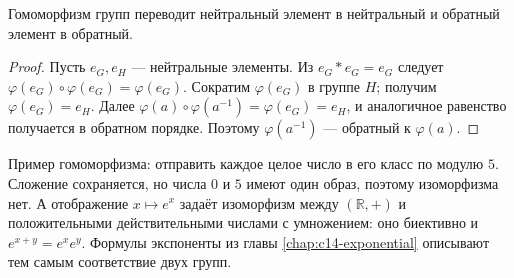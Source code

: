 \begin{theorem}\label{thm:legacy-c22-7}
Гомоморфизм групп переводит нейтральный элемент в нейтральный и обратный элемент в обратный.
\end{theorem}
\begin{proof}
Пусть \(e_G,e_H\) — нейтральные элементы. Из \(e_G*e_G=e_G\) следует \(\varphi(e_G)\circ\varphi(e_G)=\varphi(e_G)\). Сократим \(\varphi(e_G)\) в группе \(H\); получим \(\varphi(e_G)=e_H\). Далее \(\varphi(a)\circ\varphi(a^{-1})=\varphi(e_G)=e_H\), и аналогичное равенство получается в обратном порядке. Поэтому \(\varphi(a^{-1})\) — обратный к \(\varphi(a)\).
\end{proof}
Пример гомоморфизма: отправить каждое целое число в его класс по модулю \(5\). Сложение сохраняется, но числа \(0\) и \(5\) имеют один образ, поэтому изоморфизма нет. А отображение \(x\mapsto e^x\) задаёт изоморфизм между \((\mathbb R,+)\) и положительными действительными числами с умножением: оно биективно и \(e^{x+y}=e^xe^y\). Формулы экспоненты из главы \ref{chap:c14-exponential} описывают тем самым соответствие двух групп.

